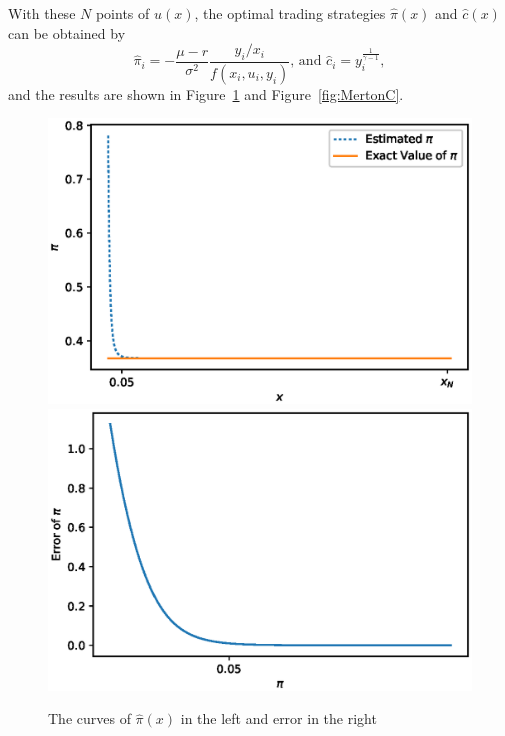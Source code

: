 \documentclass[a4paper]{article}
\theoremstyle{definition}
\numberwithin{equation}{section}
\begin{document}
With these $N$ points of $u(x)$, the optimal trading strategies $\hat\pi(x)$ and $\hat c(x)$ can be obtained by
$$\hat\pi_i=-\frac{\mu-r}{\sigma^2}\frac{y_i/x_i}{f(x_i,u_i,y_i)}\text{, and }
\hat c_i=y_i^\frac{1}{\gamma-1},$$
and the results are shown in Figure~\ref{fig:MertonPi} and Figure~\ref{fig:MertonC}.
\begin{figure}[H]
\centering
\includegraphics[scale=0.45]{Mertonpi.eps}
\includegraphics[scale=0.45]{Mertonpierror.eps}
\caption{The curves of $\hat\pi(x)$ in the left and error in the right}
\label{fig:MertonPi}
\end{figure}
\end{document}
